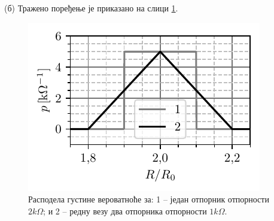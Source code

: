 (б) Тражено поређење је приказано на слици \ref{fig:\ID}.

\begin{figure}[ht!]
    \centering
    \includegraphics{fig/probabilities.pdf}
    \caption{
        Расподела густине вероватноће за: 1 -- један отпорник отпорности $2\unit{k\Omega}$; и
        2 -- редну везу два отпорника отпорности $1\unit{k\Omega}$.
    }
    \label{fig:\ID}

\end{figure}
